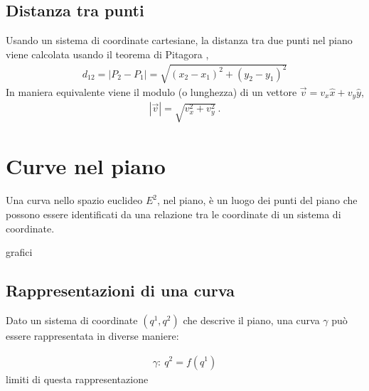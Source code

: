 \documentclass[letterpaper,10pt,italian]{jupyterBook}
\begin{document}
\subsection{Distanza tra punti}
\label{\detokenize{ch/analytic_geometry/analytic_geometry_2d/points:distanza-tra-punti}}
\sphinxAtStartPar
Usando un sistema di coordinate cartesiane, la distanza tra due punti nel piano viene calcolata usando il teorema di Pitagora ,
\begin{equation*}
\begin{split}d_{12} = |P_2 - P_1| = \sqrt{(x_2 - x_1)^2 + (y_2 - y_1)^2}\end{split}
\end{equation*}
\sphinxAtStartPar
In maniera equivalente viene il modulo (o lunghezza) di un vettore \(\vec{v} = v_x \hat{x} + v_y \hat{y}\),
\begin{equation*}
\begin{split}|\vec{v}| = \sqrt{v_x^2 + v_y^2} \ .\end{split}
\end{equation*}


\sphinxstepscope


\section{Curve nel piano}
\label{\detokenize{ch/analytic_geometry/analytic_geometry_2d/curves:curve-nel-piano}}\label{\detokenize{ch/analytic_geometry/analytic_geometry_2d/curves:geometry-analytic-2d-curves}}\label{\detokenize{ch/analytic_geometry/analytic_geometry_2d/curves::doc}}
\sphinxAtStartPar
Una curva nello spazio euclideo \(E^2\), nel piano, è un luogo dei punti del piano che possono essere identificati da una relazione tra le coordinate di un sistema di coordinate.

\sphinxAtStartPar
{}  grafici




\subsection{Rappresentazioni di una curva}
\label{\detokenize{ch/analytic_geometry/analytic_geometry_2d/curves:rappresentazioni-di-una-curva}}
\sphinxAtStartPar
Dato un sistema di coordinate \((q^1, q^2)\) che descrive il piano, una curva \(\gamma\) può essere rappresentata in diverse maniere:

\sphinxAtStartPar
{}
\begin{equation*}
\begin{split}\gamma: \ q^2 = f(q^1)\end{split}
\end{equation*}
\sphinxAtStartPar
{} limiti di questa rappresentazione
\end{document}
